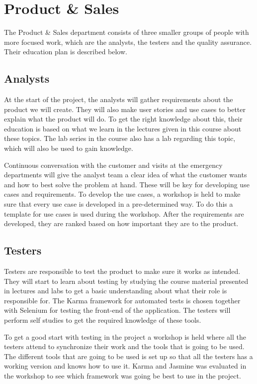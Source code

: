 \section{Product \& Sales}
\label{sec:pands}

The Product \& Sales department consists of three smaller groups of people with more focused work, which are the analysts, the testers and the quality assurance. Their education plan is described below.

\subsection{Analysts}
At the start of the project, the analysts will gather requirements about the product we will create. They will also make user stories and use cases to better explain what the product will do. To get the right knowledge about this, their education is based on what we learn in the lectures given in this course about these topics. The lab series in the course also has a lab regarding this topic, which will also be used to gain knowledge.

Continuous conversation with the customer and visits at the emergency departments will give the analyst team a clear idea of what the customer wants and how to best solve the problem at hand. These will be key for developing use cases and requirements. To develop the use cases, a workshop is held to make sure that every use case is developed in a pre-determined way. To do this a template for use cases is used during the workshop. After the requirements are developed, they are ranked based on how important they are to the product.

\subsection{Testers}
Testers are responsible to test the product to make sure it works as intended. They will start to learn about testing by studying the course material presented in lectures and labs to get a basic understanding about what their role is responsible for. The Karma framework for automated tests is chosen together with Selenium for testing the front-end of the application. The testers will perform self studies to get the required knowledge of these tools. 

To get a good start with testing in the project a workshop is held where all the testers attend to synchronize their work and the tools that is going to be used. The different tools that are going to be used is set up so that all the testers has a working version and knows how to use it. Karma and Jasmine was evaluated in the workshop to see which framework was going be best to use in the project.

